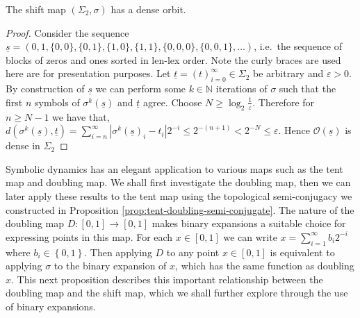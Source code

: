 \begin{prop} \label{prop:shift-map-dense-orbit}
    The shift map $(\Sigma_2, \sigma)$ has a dense orbit.
    \begin{proof}
        Consider the sequence $\underline{s} = (0, 1, \{0, 0\}, \{0, 1\}, \{1, 0\}, \{1, 1\}, \{0, 0, 0\}, \{0, 0, 1\}, \dots)$, i.e.\ the sequence of blocks of zeros and ones sorted in len-lex order. Note the curly braces are used here are for presentation purposes. Let $\underline{t} = (t)_{i=0}^{\infty} \in \Sigma_2$ be arbitrary and $\varepsilon > 0$. By construction of $\underline{s}$ we can perform some $k \in \mathbb{N}$ iterations of $\sigma$ such that the first $n$ symbols of $\sigma^k(\underline{s})$ and $\underline{t}$ agree. Choose $N \geq \log_2{\frac{1}{\varepsilon}}$. Therefore for $n \geq N - 1$ we have that, $d(\sigma^k(\underline{s}), \underline{t}) = \sum_{i = n}^{\infty}|\sigma^k(\underline{s})_i - t_i|2^{-i} \leq 2^{-(n+1)} < 2^{-N} \leq \varepsilon$. Hence $\mathcal{O}(\underline{s})$ is dense in $\Sigma_2$
    \end{proof}
\end{prop}

Symbolic dynamics has an elegant application to various maps such as the tent map and doubling map. We shall first investigate the doubling map, then we can later apply these results to the tent map using the topological semi-conjugacy we constructed in Proposition \ref{prop:tent-doubling-semi-conjugate}. The nature of the doubling map $D: [0, 1] \to [0, 1]$ makes binary expansions a suitable choice for expressing points in this map. For each $x \in [0, 1]$ we can write $x=\sum_{i=1}^{\infty}b_i2^{-i}$ where $b_i \in \left\lbrace 0, 1 \right\rbrace$. Then applying $D$ to any point $x \in [0, 1]$ is equivalent to applying $\sigma$ to the binary expansion of $x$, which has the same function as doubling $x$. This next proposition describes this important relationship between the doubling map and the shift map, which we shall further explore through the use of binary expansions.

